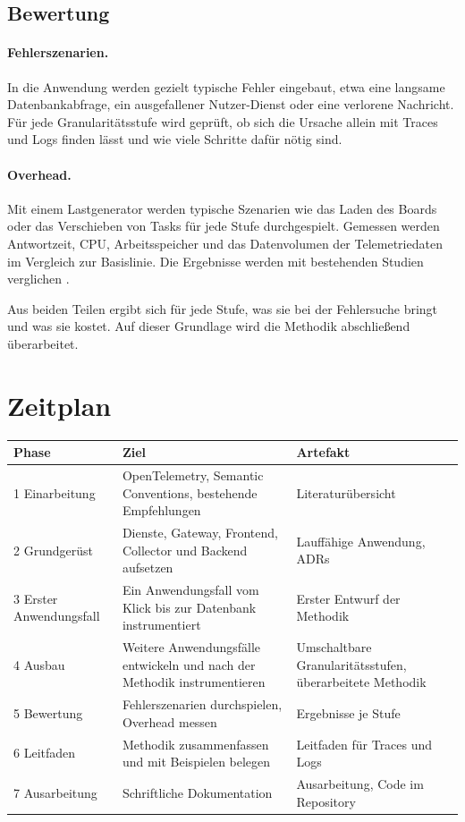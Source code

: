\documentclass[11pt, a4paper]{article}
\begin{document}
\subsection{Bewertung}

\paragraph{Fehlerszenarien.} In die Anwendung werden gezielt typische Fehler eingebaut, etwa eine langsame Datenbankabfrage, ein ausgefallener Nutzer-Dienst oder eine verlorene Nachricht. Für jede Granularitätsstufe wird geprüft, ob sich die Ursache allein mit Traces und Logs finden lässt und wie viele Schritte dafür nötig sind.

\paragraph{Overhead.} Mit einem Lastgenerator werden typische Szenarien wie das Laden des Boards oder das Verschieben von Tasks für jede Stufe durchgespielt. Gemessen werden Antwortzeit, CPU, Arbeitsspeicher und das Datenvolumen der Telemetriedaten im Vergleich zur Basislinie. Die Ergebnisse werden mit bestehenden Studien verglichen \cite{reichelt2023overhead}.

Aus beiden Teilen ergibt sich für jede Stufe, was sie bei der Fehlersuche bringt und was sie kostet. Auf dieser Grundlage wird die Methodik abschließend überarbeitet.

\section{Zeitplan}

\begin{center}
\small
\begin{tabularx}{\textwidth}{@{}l X X@{}}
\toprule
\textbf{Phase} & \textbf{Ziel} & \textbf{Artefakt} \\
\midrule
1 Einarbeitung & OpenTelemetry, Semantic Conventions, bestehende Empfehlungen & Literaturübersicht \\
2 Grundgerüst & Dienste, Gateway, Frontend, Collector und Backend aufsetzen & Lauffähige Anwendung, ADRs \\
3 Erster Anwendungsfall & Ein Anwendungsfall vom Klick bis zur Datenbank instrumentiert & Erster Entwurf der Methodik \\
4 Ausbau & Weitere Anwendungsfälle entwickeln und nach der Methodik instrumentieren & Umschaltbare Granularitätsstufen, überarbeitete Methodik \\
5 Bewertung & Fehlerszenarien durchspielen, Overhead messen & Ergebnisse je Stufe \\
6 Leitfaden & Methodik zusammenfassen und mit Beispielen belegen & Leitfaden für Traces und Logs \\
7 Ausarbeitung & Schriftliche Dokumentation & Ausarbeitung, Code im Repository \\
\bottomrule
\end{tabularx}
\end{center}

\printbibliography[heading=bibintoc, title={Literaturverzeichnis}]
\end{document}
